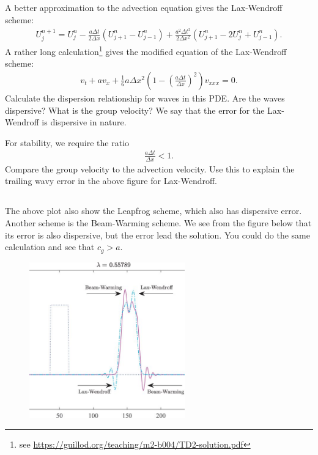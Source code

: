 \documentclass[11pt,letterpaper]{report}
\begin{document}
\subsection{}
A better approximation to the advection equation gives the Lax-Wendroff scheme:
\begin{align}
    U^{n+1}_j = U^n_j-\frac{a\Delta t}{2\Delta x}\left( U^n_{j+1}-U^n_{j-1} \right)+\frac{a^2 \Delta t^2}{2\Delta x^2}\left(U^n_{j+1}-2U^n_{j}+U^n_{j-1}\right).
\end{align}
A rather long calculation\footnote{see \url{https://guillod.org/teaching/m2-b004/TD2-solution.pdf}} gives the modified equation of the Lax-Wendroff scheme:
\begin{align}
    v_t+av_x +\frac{1}{6}a\Delta x^2\left(1-\left(\frac{a\Delta t}{\Delta x}\right)^2\right)v_{xxx} = 0.
\end{align}
Calculate the dispersion relationship for waves in this PDE. Are the waves dispersive? What is the group velocity? We say that the error for the Lax-Wendroff is dispersive in nature. 

For stability, we require the ratio
\begin{align}
    \frac{a\Delta t}{\Delta x}<1.
\end{align}
Compare the group velocity to the advection velocity. Use this to explain the trailing wavy error in the above figure for Lax-Wendroff. 

\subsection{}
The above plot also show the Leapfrog scheme, which also has dispersive error. Another scheme is the Beam-Warming scheme. We see from the figure below that its error is also dispersive, but the error lead the solution. You could do the same calculation and see that $c_g>a$. 
\begin{figure}[H]
    \centering
    \includegraphics[width=0.6\textwidth]{../Session_9/figs/beamwarming}
\end{figure}
\end{document}
